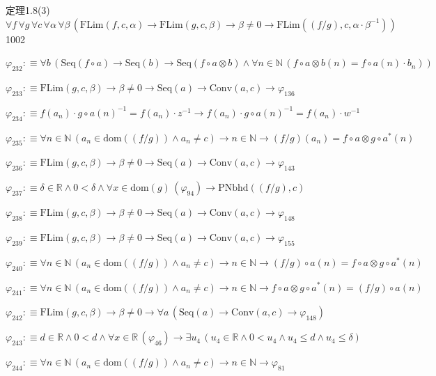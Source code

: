 \begin{fullproof}{定理1.8(3)}{$\forall f\,\forall g\,\forall c\,\forall \alpha\,\forall \beta\,(\mathrm{FLim}(f,c,\alpha) \to \mathrm{FLim}(g,c,\beta) \to \beta \neq 0 \to \mathrm{FLim}((f / g),c,\alpha \cdot \beta^{-1}))$}{1002}
\begin{abbrevlist}
\item $\varphi_{232} :\equiv \forall b\,(\mathrm{Seq}(f \circ a) \to \mathrm{Seq}(b) \to \mathrm{Seq}(f \circ a \otimes b) \land \forall n \in \mathbb{N}\,(f \circ a \otimes b(n) = f \circ a(n) \cdot b_{n}))$
\item $\varphi_{233} :\equiv \mathrm{FLim}(g,c,\beta) \to \beta \neq 0 \to \mathrm{Seq}(a) \to \mathrm{Conv}(a,c) \to \varphi_{136}$
\item $\varphi_{234} :\equiv f(a_{n}) \cdot g \circ a(n)^{-1} = f(a_{n}) \cdot z^{-1} \to f(a_{n}) \cdot g \circ a(n)^{-1} = f(a_{n}) \cdot w^{-1}$
\item $\varphi_{235} :\equiv \forall n \in \mathbb{N}\,(a_{n} \in \mathrm{dom}((f / g)) \land a_{n} \neq c) \to n \in \mathbb{N} \to (f / g)(a_{n}) = f \circ a \otimes g \circ a^{\ast}(n)$
\item $\varphi_{236} :\equiv \mathrm{FLim}(g,c,\beta) \to \beta \neq 0 \to \mathrm{Seq}(a) \to \mathrm{Conv}(a,c) \to \varphi_{143}$
\item $\varphi_{237} :\equiv \delta \in \mathbb{R} \land 0 < \delta \land \forall x \in \mathrm{dom}(g)\,(\varphi_{94}) \to \mathrm{PNbhd}((f / g),c)$
\item $\varphi_{238} :\equiv \mathrm{FLim}(g,c,\beta) \to \beta \neq 0 \to \mathrm{Seq}(a) \to \mathrm{Conv}(a,c) \to \varphi_{148}$
\item $\varphi_{239} :\equiv \mathrm{FLim}(g,c,\beta) \to \beta \neq 0 \to \mathrm{Seq}(a) \to \mathrm{Conv}(a,c) \to \varphi_{155}$
\item $\varphi_{240} :\equiv \forall n \in \mathbb{N}\,(a_{n} \in \mathrm{dom}((f / g)) \land a_{n} \neq c) \to n \in \mathbb{N} \to (f / g) \circ a(n) = f \circ a \otimes g \circ a^{\ast}(n)$
\item $\varphi_{241} :\equiv \forall n \in \mathbb{N}\,(a_{n} \in \mathrm{dom}((f / g)) \land a_{n} \neq c) \to n \in \mathbb{N} \to f \circ a \otimes g \circ a^{\ast}(n) = (f / g) \circ a(n)$
\item $\varphi_{242} :\equiv \mathrm{FLim}(g,c,\beta) \to \beta \neq 0 \to \forall a\,(\mathrm{Seq}(a) \to \mathrm{Conv}(a,c) \to \varphi_{148})$
\item $\varphi_{243} :\equiv d \in \mathbb{R} \land 0 < d \land \forall x \in \mathbb{R}\,(\varphi_{46}) \to \exists u_{4}\,(u_{4} \in \mathbb{R} \land 0 < u_{4} \land u_{4} \leq d \land u_{4} \leq \delta)$
\item $\varphi_{244} :\equiv \forall n \in \mathbb{N}\,(a_{n} \in \mathrm{dom}((f / g)) \land a_{n} \neq c) \to n \in \mathbb{N} \to \varphi_{81}$

\end{abbrevlist}
\end{fullproof}
